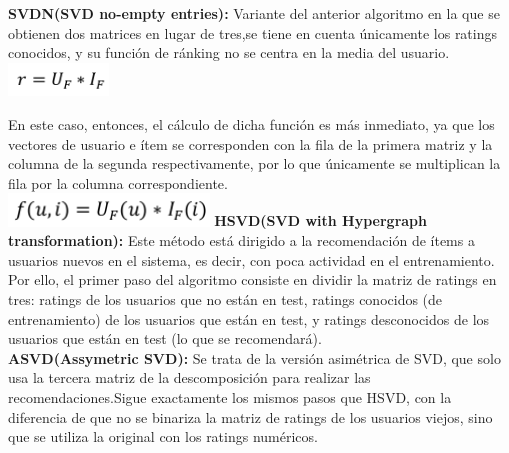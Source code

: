 \textbf{SVDN(SVD no-empty entries):} Variante del anterior algoritmo en la que se obtienen dos matrices en lugar de tres,se tiene en cuenta únicamente los ratings conocidos, y su función de ránking no se centra en la media del usuario.\cite{12}\\
\includegraphics[width=0.2\textwidth]{images/svdn1}

En este caso, entonces, el cálculo de dicha función es más inmediato, ya que los vectores de usuario e ítem se corresponden con la fila de la primera matriz y la columna de la segunda respectivamente, por lo que únicamente se multiplican la fila por la columna correspondiente.\cite{12}\\
\includegraphics[width=0.4\textwidth]{images/svdn2}
\newpage
\textbf{HSVD(SVD with Hypergraph transformation):} Este método está dirigido a la recomendación de ítems a usuarios nuevos en el sistema, es decir, con poca actividad en el entrenamiento. Por ello, el primer paso del algoritmo consiste en dividir la matriz de ratings en tres: ratings de los usuarios que no están en test, ratings conocidos (de entrenamiento) de los usuarios que están en test, y ratings desconocidos de los usuarios que están en test (lo que se recomendará).\cite{12}\\

\textbf{ASVD(Assymetric SVD):} Se trata de la versión asimétrica de SVD, que solo usa la tercera matriz de la descomposición para realizar las recomendaciones.Sigue exactamente los mismos pasos que HSVD, con la diferencia de que no se binariza la matriz de ratings de los usuarios viejos, sino que se utiliza la original con los ratings numéricos.\cite{12}

